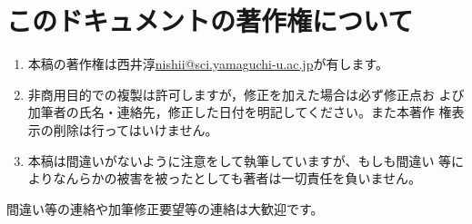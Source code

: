 \documentclass[twocolumn,11pt]{jarticle}
\begin{document}


\newpage

\section{このドキュメントの著作権について}
\begin{enumerate}
\item 本稿の著作権は西井淳\url{nishii@sci.yamaguchi-u.ac.jp}が有します。
\item 非商用目的での複製は許可しますが，修正を加えた場合は必ず修正点お
  よび加筆者の氏名・連絡先，修正した日付を明記してください。また本著作
  権表示の削除は行ってはいけません。
\item 本稿は間違いがないように注意をして執筆していますが、もしも間違い
  等によりなんらかの被害を被ったとしても著者は一切責任を負いません。
\end{enumerate}
間違い等の連絡や加筆修正要望等の連絡は大歓迎です。

\printindex
\end{document}
